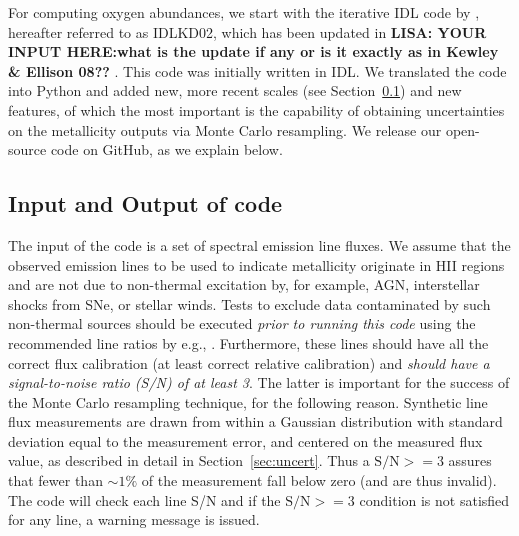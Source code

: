 \documentclass{emulateapj}
\begin{document}
\begin{figure}[!ht]
 \label{metallicity_distribution}
\end{figure}


For computing oxygen abundances, we start with the iterative IDL code by \citet{kewley02}, hereafter referred to as IDLKD02, which has been updated in \citet{kewley08} \textbf{LISA: YOUR INPUT HERE:what is the update if any or is it exactly as in Kewley \& Ellison 08?? }. This code was initially written in IDL. We translated the code into Python and added new, more recent scales (see Section~\ref{sec:IO}) and new features, of which the most important is the capability of obtaining uncertainties on the metallicity outputs via Monte Carlo resampling. We release our open-source code on GitHub, as we explain below.


\subsection{Input and Output of code}\label{sec:IO}

The input of the code is a set of spectral emission line fluxes. We assume that the observed emission lines to be used to indicate metallicity originate in HII regions and are not due to non-thermal excitation by, for example, AGN, interstellar shocks from SNe, or stellar winds.  Tests to exclude data contaminated by such non-thermal sources should be executed \emph{prior to running this code} using the recommended line ratios by e.g., \citet{baldwin81,kauffmann03,kewley06_sdss}. Furthermore, these lines should have all the correct flux calibration (at least correct relative calibration) and \emph{should have a signal-to-noise ratio (S/N) of at least 3}. The latter is important for the success of the Monte Carlo resampling technique, for the following reason.
Synthetic line flux measurements are drawn from within a Gaussian distribution with standard deviation equal to the measurement error, and centered on the measured flux value, as described in detail in Section~\ref{sec:uncert}. Thus a $\mathrm{S/N} >= 3$ assures that fewer than $\sim1\%$ of the measurement fall below zero (and are thus invalid).
The code will check each line S/N and if the $\mathrm{S/N} >= 3$ condition is not satisfied for any line, a warning message is issued.
\end{document}
